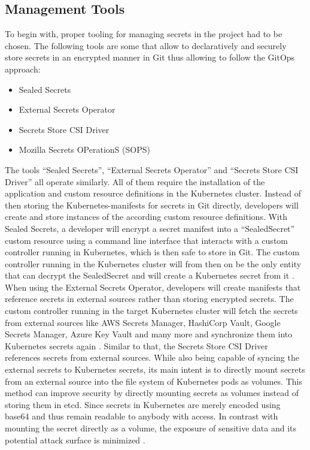         \subsection{Management Tools}
        \label{subsection:secret-management-tools-poc}
        
            To begin with, proper tooling for managing secrets in the project had to be chosen. The following tools are some that allow to declaratively and securely store secrets in an encrypted manner in Git thus allowing to follow the GitOps approach:
    
            \begin{itemize}
                \item Sealed Secrets
                \item External Secrets Operator
                \item Secrets Store CSI Driver
                \item Mozilla Secrets OPerationS (SOPS)
            \end{itemize}
    
            \noindent The tools ``Sealed Secrets'', ``External Secrets Operator'' and ``Secrets Store CSI Driver'' all operate similarly. All of them require the installation of the application and custom resource definitions in the Kubernetes cluster. Instead of then storing the Kubernetes-manifests for secrets in Git directly, developers will create and store instances of the according custom resource definitions. With Sealed Secrets, a developer will encrypt a secret manifest into a ``SealedSecret'' custom resource using a command line interface that interacts with a custom controller running in Kubernetes, which is then safe to store in Git. The custom controller running in the Kubernetes cluster will from then on be the only entity that can decrypt the SealedSecret and will create a Kubernetes secret from it \cite{sealedsecrets}. When using the External Secrets Operator, developers will create manifests that reference secrets in external sources rather than storing encrypted secrets. The custom controller running in the target Kubernetes cluster will fetch the secrets from external sources like AWS Secrets Manager, HashiCorp Vault, Google Secrets Manager, Azure Key Vault and many more and synchronize them into Kubernetes secrets again \cite{externalsecretsoperator}. Similar to that, the Secrets Store CSI Driver references secrets from external sources. While also being capable of syncing the external secrets to Kubernetes secrets, its main intent is to directly mount secrets from an external source into the file system of Kubernetes pods as volumes. This method can improve security by directly mounting secrets as volumes instead of storing them in etcd. Since secrets in Kubernetes are merely encoded using base64 and thus remain readable to anybody with access. In contrast with mounting the secret directly as a volume, the exposure of sensitive data and its potential attack surface is minimized \cite{secrets-csi-driver}. \newline
    
